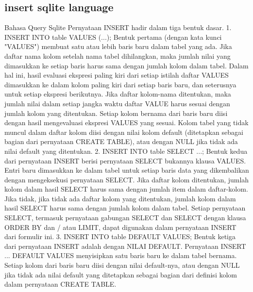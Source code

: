 \subsection{insert sqlite language}
\begin{enumerate}
\itemSisipan Bahasa Query Sqlite
Pernyataan INSERT hadir dalam tiga bentuk dasar.
1. INSERT INTO table VALUES (...);
Bentuk pertama (dengan kata kunci "VALUES") membuat satu atau lebih baris baru dalam tabel yang ada. Jika daftar nama kolom setelah nama tabel dihilangkan, maka jumlah nilai yang dimasukkan ke setiap baris harus sama dengan jumlah kolom dalam tabel. Dalam hal ini, hasil evaluasi ekspresi paling kiri dari setiap istilah daftar VALUES dimasukkan ke dalam kolom paling kiri dari setiap baris baru, dan seterusnya untuk setiap ekspresi berikutnya. Jika daftar kolom-nama ditentukan, maka jumlah nilai dalam setiap jangka waktu daftar VALUE harus sesuai dengan jumlah kolom yang ditentukan. Setiap kolom bernama dari baris baru diisi dengan hasil mengevaluasi ekspresi VALUES yang sesuai. Kolom tabel yang tidak muncul dalam daftar kolom diisi dengan nilai kolom default (ditetapkan sebagai bagian dari pernyataan CREATE TABLE), atau dengan NULL jika tidak ada nilai default yang ditentukan.
2. INSERT INTO table SELECT ...;
Bentuk kedua dari pernyataan INSERT berisi pernyataan SELECT bukannya klausa VALUES. Entri baru dimasukkan ke dalam tabel untuk setiap baris data yang dikembalikan dengan mengeksekusi pernyataan SELECT. Jika daftar kolom ditentukan, jumlah kolom dalam hasil SELECT harus sama dengan jumlah item dalam daftar-kolom. Jika tidak, jika tidak ada daftar kolom yang ditentukan, jumlah kolom dalam hasil SELECT harus sama dengan jumlah kolom dalam tabel. Setiap pernyataan SELECT, termasuk pernyataan gabungan SELECT dan SELECT dengan klausa ORDER BY dan / atau LIMIT, dapat digunakan dalam pernyataan INSERT dari formulir ini.
3. INSERT INTO table DEFAULT VALUES;
Bentuk ketiga dari pernyataan INSERT adalah dengan NILAI DEFAULT. Pernyataan INSERT ... DEFAULT VALUES menyisipkan satu baris baru ke dalam tabel bernama. Setiap kolom dari baris baru diisi dengan nilai default-nya, atau dengan NULL jika tidak ada nilai default yang ditetapkan sebagai bagian dari definisi kolom dalam pernyataan CREATE TABLE.
\end{enumerate}
			
			
